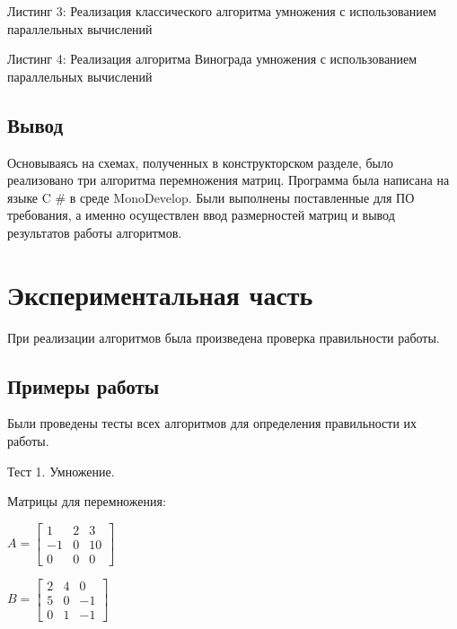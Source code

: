 \documentclass[12pt,a4paper]{scrartcl}
\begin{document}
	\newpage
	Листинг 3: Реализация классического алгоритма умножения с использованием параллельных вычислений
	
	
	\newpage
	Листинг 4: Реализация алгоритма Винограда умножения с использованием параллельных вычислений
	
	
	\subsection{Вывод}
	\label{sec:tech:conclusion}
	
	Основываясь на схемах, полученных в конструкторском разделе, было реализовано три алгоритма перемножения матриц. 
	Программа была написана на языке C \# в среде MonoDevelop. 
	Были выполнены поставленные для ПО требования, а именно осуществлен ввод размерностей матриц и вывод результатов работы алгоритмов.

        \newpage
	
	\section{Экспериментальная часть}
	\label{sec:exp}
	
	При реализации алгоритмов была произведена проверка правильности работы. 	
	
	\subsection{Примеры работы}
	\label{sec:exp:examples}
	
	Были проведены тесты всех алгоритмов для определения правильности их работы.
	
	Тест 1. Умножение.
	
	Матрицы для перемножения:
	
	\begin{minipage}[c][3cm][c]{0,5\textwidth}
		\begin{math}\label{eq:test11}
		A =\begin{bmatrix}
		1 & 2 & 3\\
		-1 & 0 & 10\\
		0 & 0 & 0
		\end{bmatrix}
		\end{math}
	\end{minipage}
	\begin{minipage}[c][3cm][c]{0,5\textwidth}
		\begin{math}\label{eq:test12}
		B =\begin{bmatrix}
		2 & 4 & 0\\
		5 & 0 & -1\\
		0 & 1 & -1
		\end{bmatrix}
		\end{math}
	\end{minipage}
	
\end{document}
